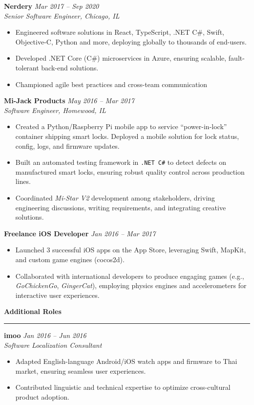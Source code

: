 \documentclass[letterpaper,10pt]{article}
\newcommand{\resheading}[1]{
  \vspace{10pt}
  \textbf{\large #1}
  \vspace{5pt}
  \hrule
  \vspace{5pt}
}
\begin{document}
\textbf{Nerdery} \hfill \textit{Mar 2017 -- Sep 2020}\\
\emph{Senior Software Engineer, Chicago, IL}\\
\begin{itemize}
  \item Engineered software solutions in React, TypeScript, .NET C#, Swift, Objective-C, Python and more, 
        deploying globally to thousands of end-users.
  \item Developed .NET Core (C\#) microservices in Azure, ensuring 
        scalable, fault-tolerant back-end solutions.
  \item Championed agile best practices and cross-team communication
\end{itemize}

\textbf{Mi-Jack Products} \hfill \textit{May 2016 -- Mar 2017}\\
\emph{Software Engineer, Homewood, IL}\\
\begin{itemize}
  \item Created a Python/Raspberry Pi mobile app to service “power-in-lock” 
        container shipping smart locks. Deployed a mobile 
        solution for lock status, config, logs, and firmware updates.
  \item Built an automated testing framework in \texttt{.NET C\#} to detect 
        defects on manufactured smart locks, ensuring robust quality 
        control across production lines.
  \item Coordinated \emph{Mi-Star V2} development among stakeholders, 
        driving engineering discussions, writing requirements, 
        and integrating creative solutions.
\end{itemize}

\textbf{Freelance iOS Developer} \hfill \textit{Jan 2016 -- Mar 2017}\\
\begin{itemize}
  \item Launched 3 successful iOS apps on the App Store, leveraging Swift, 
        MapKit, and custom game engines (cocos2d).
  \item Collaborated with international developers to produce engaging 
        games (e.g., \emph{GoChickenGo}, \emph{GingerCat}), employing 
        physics engines and accelerometers for interactive user experiences.
\end{itemize}

\resheading{Additional Roles}
\textbf{imoo} \hfill \textit{Jan 2016 -- Jun 2016}\\
\emph{Software Localization Consultant}\\
\begin{itemize}
  \item Adapted English-language Android/iOS watch apps and firmware to Thai market, 
        ensuring seamless user experiences.
  \item Contributed linguistic and technical expertise to optimize 
        cross-cultural product adoption.
\end{itemize}
\end{document}
